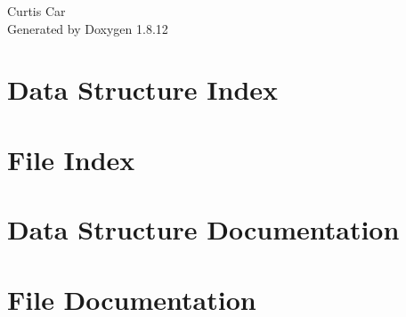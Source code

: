 \documentclass[twoside]{book}
\newcommand{\+}{\discretionary{\mbox{\scriptsize$\hookleftarrow$}}{}{}}
\newcommand{\clearemptydoublepage}{%
  \newpage{\pagestyle{empty}\cleardoublepage}%
}
\begin{document}
\hypersetup{pageanchor=false,
             bookmarksnumbered=true,
             pdfencoding=unicode
            }
\begin{titlepage}
\vspace*{7cm}
\begin{center}%
{\Large Curtis Car }\\
\vspace*{1cm}
{\large Generated by Doxygen 1.8.12}\\
\end{center}
\end{titlepage}
\clearemptydoublepage
{}
\tableofcontents
\clearemptydoublepage
{}
\hypersetup{pageanchor=true}

\chapter{Data Structure Index}

\chapter{File Index}

\chapter{Data Structure Documentation}



\chapter{File Documentation}



































































\backmatter
\newpage
{}
\clearemptydoublepage
{}
\printindex
\end{document}
